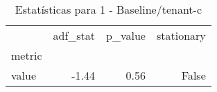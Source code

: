 \begin{table}[htbp]
\caption{Estatísticas para 1 - Baseline/tenant-c}
\label{tab:1_-_baseline_tenant-c_adf_test}
\begin{tabular}{lrrr}
\toprule
 & adf_stat & p_value & stationary \\
metric &  &  &  \\
\midrule
value & -1.44 & 0.56 & False \\
\bottomrule
\end{tabular}
\end{table}
